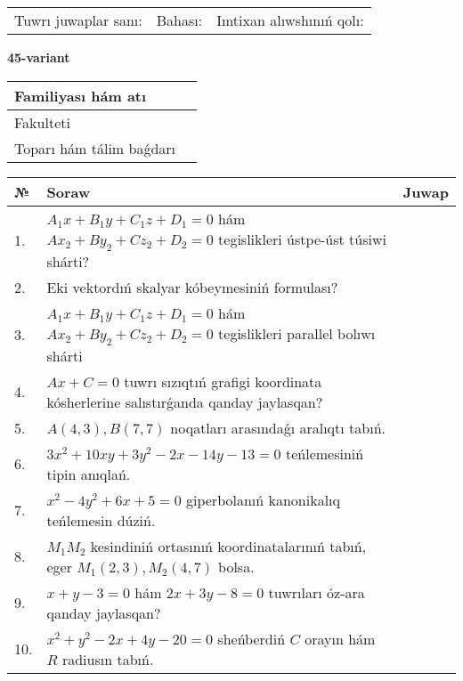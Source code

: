 \documentclass{article}
\begin{document}
\vspace{1cm}

\begin{tabular}{lll}
Tuwrı juwaplar sanı: \underline{\hspace{1.5cm}} & 
Bahası: \underline{\hspace{1.5cm}} & 
Imtixan alıwshınıń qolı: \underline{\hspace{2cm}} \\
\end{tabular}

\egroup

\newpage


\textbf{45-variant}\\

\bgroup
\def\arraystretch{1.6} %

\begin{tabular}{|m{5.7cm}|m{9.5cm}|}
\hline
Familiyası hám atı & \\
\hline
Fakulteti  & \\
\hline
Toparı hám tálim baǵdarı  & \\
\hline
\end{tabular}

\vspace{1cm}

\begin{tabular}{|m{0.7cm}|m{10cm}|m{4cm}|}
\hline
№ & Soraw & Juwap \\
\hline
1. & $A_1x+B_1y+C_1z+D_1=0$ hám $Ax_2+By_2+Cz_2+D_2=0$ tegislikleri ústpe-úst túsiwi shárti? &  \\
\hline
2. & Eki vektordıń skalyar kóbeymesiniń formulası? &  \\
\hline
3. & $A_1x+B_1y+C_1z+D_1=0$ hám $Ax_2+By_2+Cz_2+D_2=0$ tegislikleri parallel bolıwı shárti &  \\
\hline
4. & $Ax+C=0$ tuwrı sızıqtıń grafigi koordinata kósherlerine salıstırǵanda qanday jaylasqan? &  \\
\hline
5. & $A(4, 3), B(7, 7)$ noqatları arasındaǵı aralıqtı tabıń. &  \\
\hline
6. & $3x^{2}+10xy+3y^{2}-2x-14y-13=0$ teńlemesiniń tipin anıqlań. &  \\
\hline
7. & $x^{2}-4y^{2}+6x+5=0$ giperbolanıń kanonikalıq teńlemesin dúziń. &  \\
\hline
8. & $M_{1}M_{2}$ kesindiniń ortasınıń koordinatalarınıń tabıń, eger $M_{1} (2, 3), M_{2} (4, 7)$ bolsa. &  \\
\hline
9. & $x+y-3=0$ hám $2x+3y-8=0$ tuwrıları óz-ara qanday jaylasqan? &  \\
\hline
10. & $x^{2}+y^{2}-2x+4y-20=0$ sheńberdiń $C$ orayın hám $R$ radiusın tabıń. &  \\
\hline
\end{tabular}
\end{document}
